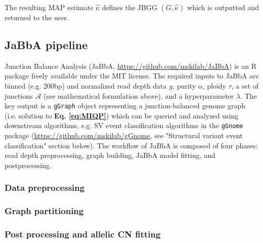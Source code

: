 \documentclass[phd,tocprelim]{cornell}
\begin{document}
The resulting MAP estimate $\hat{\kappa}$ defines the JBGG $(G,\hat{\kappa})$ which is outputted and returned to the user. 


\subsection{JaBbA pipeline}
Junction Balance Analysis (JaBbA, \url{https://github.com/mskilab/JaBbA}) is an R package freely available under the MIT license. The required inputs to JaBbA are binned (e.g. 200bp) and normalized read depth data $y$, purity $\alpha$, ploidy $\tau$, a set of junctions $\mathcal{A}$ (see mathematical formulation above), and a hyperparameter $\lambda$. The key output is a \texttt{gGraph} object representing a junction-balanced genome graph (i.e. solution to \textbf{Eq. \ref{eq:MIQP}}) which can be queried and analyzed using downstream algorithms, e.g. SV event classification algorithms in the \texttt{gGnome} package (\url{https://github.com/mskilab/gGnome}, see "Structural variant event classification" section below). The workflow of JaBbA is composed of four phases: read depth preprocessing, graph building, JaBbA model fitting, and postprocessing.

\subsubsection*{Data preprocessing}

\subsubsection*{Graph partitioning}


\subsubsection*{Post processing and allelic CN fitting}
\end{document}
